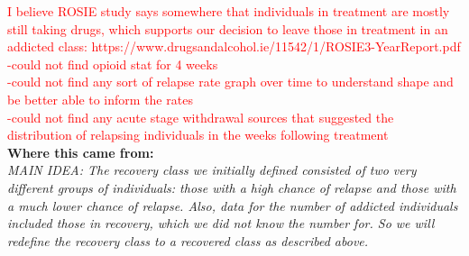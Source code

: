\documentclass[12pt]{article}
\begin{document}
\textcolor{red}{I believe ROSIE study says somewhere that individuals in treatment are mostly still taking drugs, which supports our decision to leave those in treatment in an addicted class: https://www.drugsandalcohol.ie/11542/1/ROSIE3-YearReport.pdf} \\ 

\textcolor{red}{-could not find opioid stat for 4 weeks \\
-could not find any sort of relapse rate graph over time to understand shape and be better able to inform the rates \\
-could not find any acute stage withdrawal sources that suggested the distribution of relapsing individuals in the weeks following treatment}  \\



\textbf{Where this came from:} \\

\textit{MAIN IDEA: The recovery class we initially defined consisted of two very different groups of individuals: those with a high chance of relapse and those with a much lower chance of relapse. Also, data for the number of addicted individuals included those in recovery, which we did not know the number for. So we will redefine the recovery class to a recovered class as described above.} \\
\end{document}
